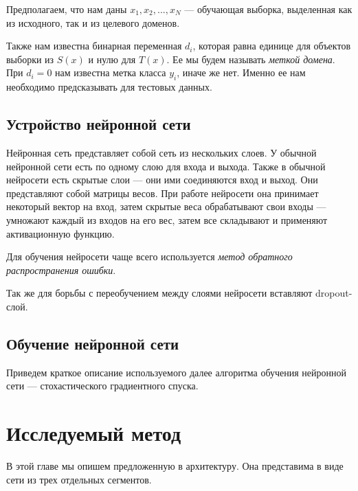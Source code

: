 \documentclass[14pt]{extarticle}
\begin{document}
Предполагаем, что нам даны ${x_1, x_2, ..., x_N}$ — обучающая выборка, выделенная как из исходного, так и из целевого доменов.

 Также нам известна бинарная переменная $d_i$, которая равна единице для объектов выборки из $S(x)$ и нулю для $T(x)$. Ее мы будем называть \textit{меткой домена}. При $d_i = 0$ нам известна метка класса $y_i$, иначе же нет. Именно ее нам необходимо предсказывать для тестовых данных.

\subsection{Устройство нейронной сети}

Нейронная сеть представляет собой сеть из нескольких слоев. У обычной нейронной сети есть по одному слою для входа и выхода. Также в обычной нейросети есть скрытые слои — они ими соединяются вход и выход. Они представляют собой матрицы весов. При работе нейросети она принимает некоторый вектор на вход, затем скрытые веса обрабатывают свои входы — умножают каждый из входов на его вес, затем все складывают и применяют активационную функцию. 

Для обучения нейросети чаще всего используется \textit{метод обратного распространения ошибки}. 

Так же для борьбы с переобучением между слоями нейросети вставляют dropout-слой. 

\subsection{Обучение нейронной сети}
Приведем краткое описание используемого далее алгоритма обучения нейронной сети — стохастического градиентного спуска.

\newpage
\section{Исследуемый метод}
 
В этой главе мы опишем предложенную в \cite{ganin} архитектуру. Она представима в виде сети из трех отдельных сегментов.
 
\end{document}
